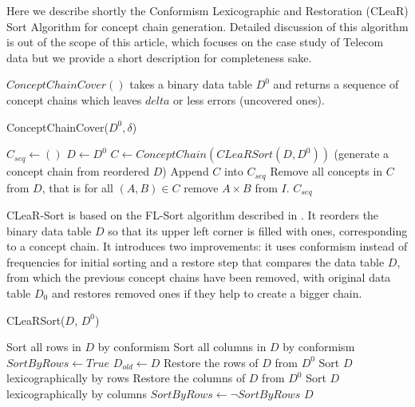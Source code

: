 \documentclass[acmconf,authordraft]{acmart}
\begin{document}
Here we describe shortly the Conformism Lexicographic and Restoration (CLeaR) Sort Algorithm for concept chain generation. Detailed discussion of this algorithm is out of the scope of this article, which focuses on the case study of Telecom data but we provide a short description for completeness sake.

$ConceptChainCover()$ takes a binary data table $D^0$ and returns a sequence of concept chains which leaves $delta$ or less errors (uncovered ones).

\begin{algorithm}
\caption{ConceptChainCover($D^0, \delta$)}
\label{Meta-algorithm}
\begin{algorithmic}
\State $C_{seq} \gets ()$
\State $D \gets D^0$
    \State  $C \gets ConceptChain(CLeaRSort(D, D^0))$ (generate a concept chain from reordered $D$)
    \State Append $C$ into $C_{seq}$
    \State Remove all concepts in $C$ from $D$, that is for all $(A, B) \in C$ remove  $A \times B$ from $I$.
\EndWhile
\State \Return $C_{seq}$
\end{algorithmic}
\end{algorithm}

CLeaR-Sort is based on the FL-Sort algorithm described in \cite{torim_covering_2019}. It reorders the binary data table $D$ so that its upper left corner is filled with ones, corresponding to a concept chain.  It introduces two improvements: it uses conformism instead of frequencies for initial sorting and a restore step that compares the data table $D$, from which the previous concept chains have been removed, with original data table $D_0$ and restores removed ones if they help to create a bigger chain. 


\begin{algorithm}
\caption{CLeaRSort($D$, $D^0$)}
\label{CLeaR-Sort}
\begin{algorithmic}
\State Sort all rows in $D$ by conformism
\State Sort all columns in $D$ by conformism
\State $SortByRows \gets True$
    \State $D_{old} \gets D$
        \State Restore the rows of $D$ from $D^0$ 
        \State Sort $D$ lexicographically by rows
    \Else
        \State Restore the columns of $D$ from $D^0$
        \State Sort $D$ lexicographically by columns
    \EndIf
    \State $SortByRows \gets \neg SortByRows$
\EndWhile
\State \Return $D$
\end{algorithmic}
\end{algorithm}
\end{document}
